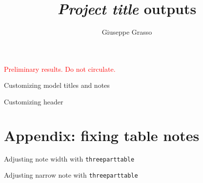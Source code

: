 \documentclass[11pt,a4paper]{article}
\title{\textit{Project title} outputs}
\author{Giuseppe Grasso}
\affil{LISER / University of Luxembourg \\ giuseppe.grasso@liser.lu}
\begin{document}
\maketitle
\listoftables
\medskip
\textcolor{red}{Preliminary results. Do not circulate.}

\pagebreak

\begin{table}[H]
	\caption{Customizing model titles and notes}
	\begin{adjustbox}{max width = \textwidth}
		
	\end{adjustbox}
\end{table}

\begin{table}[H]
	\caption{Customizing header}
	\begin{adjustbox}{max width = \textwidth}
		
	\end{adjustbox}
\end{table}

\pagebreak

\section*{Appendix: fixing table notes}
\setcounter{table}{0}
\renewcommand{\thetable}{A\arabic{table}}
 
\begin{table}[H]
	\centering
	\caption{Adjusting note width with \texttt{threeparttable}}
	\begin{adjustbox}{max width = \textwidth}
		\begin{threeparttable}
			
		\end{threeparttable}
	\end{adjustbox}
\end{table}


\begin{table}[H]
	\centering
	\caption{Adjusting narrow note with \texttt{threeparttable}}
	\begin{adjustbox}{max width = \textwidth}
		\begin{threeparttable}
			
		\end{threeparttable}
	\end{adjustbox}
\end{table}
\end{document}
